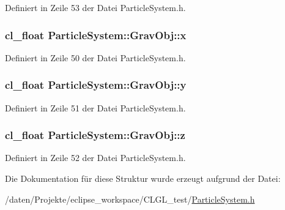 Definiert in Zeile 53 der Datei Particle\-System.\-h.

\hypertarget{structParticleSystem_1_1GravObj_af8b40c8baac8ffc87c2ff94da520e6e6}{
\subsubsection[{x}]{\setlength{\rightskip}{0pt plus 5cm}cl\-\_\-float Particle\-System\-::\-Grav\-Obj\-::x}}\label{structParticleSystem_1_1GravObj_af8b40c8baac8ffc87c2ff94da520e6e6}


Definiert in Zeile 50 der Datei Particle\-System.\-h.

\hypertarget{structParticleSystem_1_1GravObj_a61f790d3ed600fe93af533abee250297}{
\subsubsection[{y}]{\setlength{\rightskip}{0pt plus 5cm}cl\-\_\-float Particle\-System\-::\-Grav\-Obj\-::y}}\label{structParticleSystem_1_1GravObj_a61f790d3ed600fe93af533abee250297}


Definiert in Zeile 51 der Datei Particle\-System.\-h.

\hypertarget{structParticleSystem_1_1GravObj_aa8d66d46d2ec63bbdcc8b451e2283278}{
\subsubsection[{z}]{\setlength{\rightskip}{0pt plus 5cm}cl\-\_\-float Particle\-System\-::\-Grav\-Obj\-::z}}\label{structParticleSystem_1_1GravObj_aa8d66d46d2ec63bbdcc8b451e2283278}


Definiert in Zeile 52 der Datei Particle\-System.\-h.



Die Dokumentation für diese Struktur wurde erzeugt aufgrund der Datei\-:\begin{DoxyCompactItemize}
\item 
/daten/\-Projekte/eclipse\-\_\-workspace/\-C\-L\-G\-L\-\_\-test/\hyperlink{CLGL__test_2ParticleSystem_8h}{Particle\-System.\-h}\end{DoxyCompactItemize}
